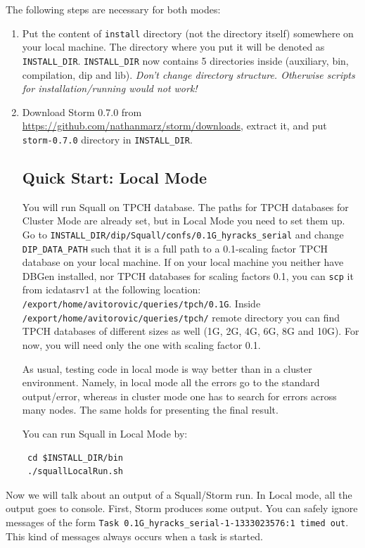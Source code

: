 \documentclass[a4paper,10pt]{article}
\begin{document}
The following steps are necessary for both modes:
\begin{enumerate}
 \item Put the content of \verb#install# directory (not the directory itself) somewhere on your local machine. The directory where you put it will be denoted as \verb#INSTALL_DIR#. \verb#INSTALL_DIR# now contains 5 directories inside (auxiliary, bin, compilation, dip and lib). \textit{Don't change directory structure. Otherwise scripts for installation/running would not work!}
 \item Download Storm 0.7.0 from \url{https://github.com/nathanmarz/storm/downloads}, extract it, and put \verb#storm-0.7.0# directory in \verb#INSTALL_DIR#.
 
\subsection{Quick Start: Local Mode}
You will run Squall on TPCH database. The paths for TPCH databases for Cluster Mode are already set, but in Local Mode you need to set them up. Go to \verb#INSTALL_DIR/dip/Squall/confs/0.1G_hyracks_serial# and change \verb#DIP_DATA_PATH# such that it is a full path to a 0.1-scaling factor TPCH database on your local machine. If on your local machine you neither have DBGen installed, nor TPCH databases for scaling factors 0.1, you can \verb#scp# it from icdatasrv1 at the following location: \\ \verb#/export/home/avitorovic/queries/tpch/0.1G#. Inside \\ \verb#/export/home/avitorovic/queries/tpch/# remote directory you can find TPCH databases of different sizes as well (1G, 2G, 4G, 6G, 8G and 10G). For now, you will need only the one with scaling factor 0.1.

As usual, testing code in local mode is way better than in a cluster environment. Namely, in local mode all the errors go to the standard output/error, whereas in cluster mode one has to search for errors across many nodes. The same holds for presenting the final result.

You can run Squall in Local Mode by:
\begin{verbatim}
 cd $INSTALL_DIR/bin
 ./squallLocalRun.sh
\end{verbatim}
\end{enumerate}

Now we will talk about an output of a Squall/Storm run. In Local mode, all the output goes to console. First, Storm produces some output. You can safely ignore messages of the form \verb#Task 0.1G_hyracks_serial-1-1333023576:1 timed out#. This kind of messages always occurs when a task is started.
\end{document}
